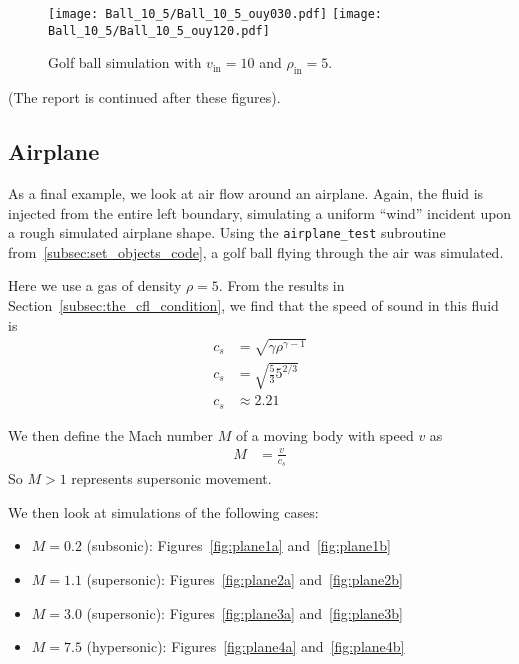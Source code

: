 \documentclass[twocolumn]{myarticle}
\numberwithin{equation}{section}
\begin{document}
\begin{figure*}[ht]
    \centering
    \texttt{[image: Ball\_10\_5/Ball\_10\_5\_ouy030.pdf]}
    \texttt{[image: Ball\_10\_5/Ball\_10\_5\_ouy120.pdf]}
    \caption{Golf ball simulation with $ v_\text{in} = 10 $ and $ \rho_\text{in} = 5 $.}
    \label{fig:ball8}
\end{figure*}

(The report is continued after these figures).

\clearpage

\subsection{Airplane}
\label{subsec:airplane}

As a final example, we look at air flow around an airplane.
Again, the fluid is injected from the entire left boundary, simulating a uniform ``wind'' incident upon a rough simulated airplane shape.
Using the \texttt{airplane\_test} subroutine from~\ref{subsec:set_objects_code}, a golf ball flying through the air was simulated.

Here we use a gas of density $ \rho = 5 $.
From the results in Section~\ref{subsec:the_cfl_condition}, we find that the speed of sound in this fluid is
\begin{align}
    c_s &= \sqrt{\gamma \rho^{\gamma-1}}
    \\
    c_s &= \sqrt{\frac{5}{3} 5^{2/3}}
    \\
    c_s &\approx 2.21
\end{align}

We then define the Mach number $ M $ of a moving body with speed $ v $ as
\begin{align}
    M &= \frac{v}{c_s}
\end{align}
So $ M > 1 $ represents supersonic movement.

We then look at simulations of the following cases:
\begin{itemize}
\item
    $ M = 0.2 $ (subsonic): Figures~\ref{fig:plane1a} and~\ref{fig:plane1b}
\item
    $ M = 1.1 $ (supersonic): Figures~\ref{fig:plane2a} and~\ref{fig:plane2b}
\item
    $ M = 3.0 $ (supersonic): Figures~\ref{fig:plane3a} and~\ref{fig:plane3b}
\item
    $ M = 7.5 $ (hypersonic): Figures~\ref{fig:plane4a} and~\ref{fig:plane4b}
\end{itemize}
\end{document}
